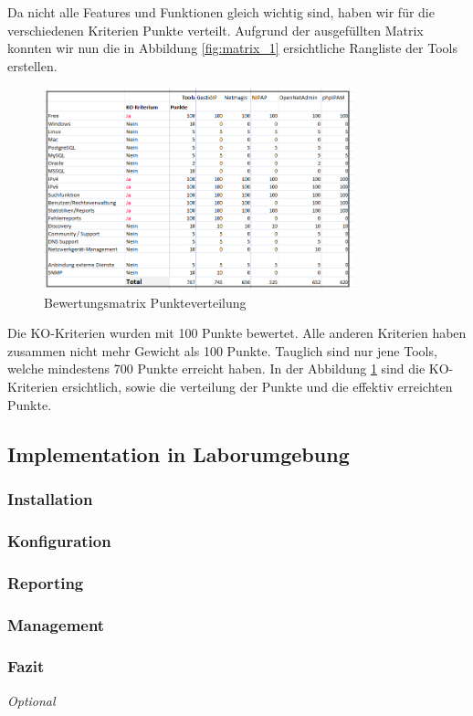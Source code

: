 \documentclass[11pt,a4paper,parskip=half]{scrartcl}
\begin{document}
Da nicht alle Features und Funktionen gleich wichtig sind, haben wir für die verschiedenen Kriterien Punkte verteilt. Aufgrund der ausgefüllten Matrix konnten wir nun die in Abbildung \ref{fig:matrix_1} ersichtliche Rangliste der Tools erstellen.
\begin{figure}[H]
\centering
\includegraphics[width=0.8\textwidth]{Phase3/Matrix_2.png}
\caption{Bewertungsmatrix Punkteverteilung}
\label{fig:matrix_2}
\end{figure}

Die KO-Kriterien wurden mit 100 Punkte bewertet. Alle anderen Kriterien haben zusammen nicht mehr Gewicht als 100 Punkte. Tauglich sind nur jene Tools, welche mindestens 700 Punkte erreicht haben. In der Abbildung  \ref{fig:matrix_2} sind die KO-Kriterien ersichtlich, sowie die verteilung der Punkte und die effektiv erreichten Punkte.
\subsection{Implementation in Laborumgebung}
\subsubsection{Installation}
\subsubsection{Konfiguration}
\subsubsection{Reporting}
\subsubsection{Management}
\subsubsection{Fazit}
\textit{Optional}
\end{document}
